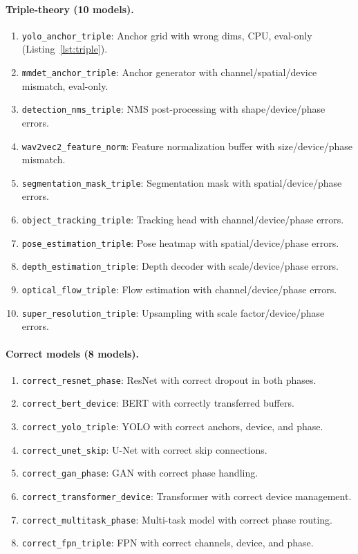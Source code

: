 \documentclass[10pt]{article}
\theoremstyle{plain}
\theoremstyle{definition}
\theoremstyle{remark}
\begin{document}
\paragraph{Triple-theory (10 models).}
\begin{enumerate}[nosep,leftmargin=2em]
  \item \texttt{yolo\_anchor\_triple}: Anchor grid with wrong dims,
    CPU, eval-only (Listing~\ref{lst:triple}).
  \item \texttt{mmdet\_anchor\_triple}: Anchor generator with
    channel/spatial/device mismatch, eval-only.
  \item \texttt{detection\_nms\_triple}: NMS post-processing with
    shape/device/phase errors.
  \item \texttt{wav2vec2\_feature\_norm}: Feature normalization buffer
    with size/device/phase mismatch.
  \item \texttt{segmentation\_mask\_triple}: Segmentation mask with
    spatial/device/phase errors.
  \item \texttt{object\_tracking\_triple}: Tracking head with
    channel/device/phase errors.
  \item \texttt{pose\_estimation\_triple}: Pose heatmap with
    spatial/device/phase errors.
  \item \texttt{depth\_estimation\_triple}: Depth decoder with
    scale/device/phase errors.
  \item \texttt{optical\_flow\_triple}: Flow estimation with
    channel/device/phase errors.
  \item \texttt{super\_resolution\_triple}: Upsampling with
    scale factor/device/phase errors.
\end{enumerate}

\paragraph{Correct models (8 models).}
\begin{enumerate}[nosep,leftmargin=2em]
  \item \texttt{correct\_resnet\_phase}: ResNet with correct dropout
    in both phases.
  \item \texttt{correct\_bert\_device}: BERT with correctly transferred
    buffers.
  \item \texttt{correct\_yolo\_triple}: YOLO with correct anchors,
    device, and phase.
  \item \texttt{correct\_unet\_skip}: U-Net with correct skip
    connections.
  \item \texttt{correct\_gan\_phase}: GAN with correct phase handling.
  \item \texttt{correct\_transformer\_device}: Transformer with correct
    device management.
  \item \texttt{correct\_multitask\_phase}: Multi-task model with
    correct phase routing.
  \item \texttt{correct\_fpn\_triple}: FPN with correct channels,
    device, and phase.
\end{enumerate}
\end{document}
